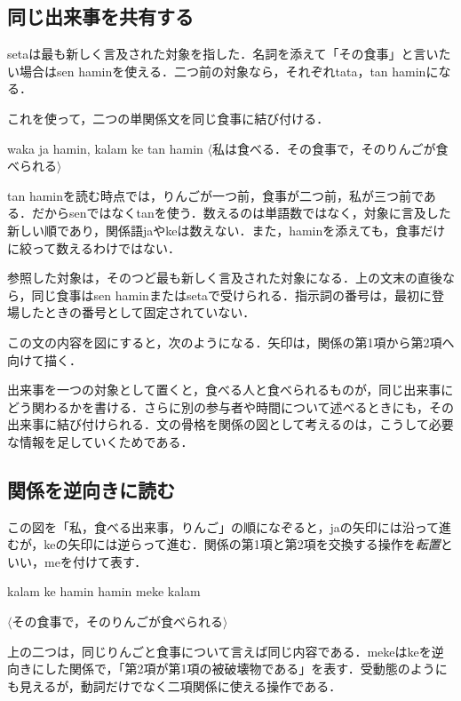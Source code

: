 \documentclass[b5paper, 10pt]{ltjsarticle}
\newcommand{\ko}[1]{\textsf{#1}}
\newcommand{\sentence}[1]{$\langle$#1$\rangle$}
\begin{document}
\subsection{同じ出来事を共有する}
\ko{seta}は最も新しく言及された対象を指した．名詞を添えて「その食事」と言いたい場合は\ko{sen hamin}を使える．二つ前の対象なら，それぞれ\ko{tata}，\ko{tan hamin}になる．

これを使って，二つの単関係文を同じ食事に結び付ける．
\begin{exe}
    \ex \ko{waka ja hamin, kalam ke tan hamin}
    \glt \sentence{私は食べる．その食事で，そのりんごが食べられる}
\end{exe}
\ko{tan hamin}を読む時点では，りんごが一つ前，食事が二つ前，私が三つ前である．だから\ko{sen}ではなく\ko{tan}を使う．数えるのは単語数ではなく，対象に言及した新しい順であり，関係語\ko{ja}や\ko{ke}は数えない．また，\ko{hamin}を添えても，食事だけに絞って数えるわけではない．

参照した対象は，そのつど最も新しく言及された対象になる．上の文末の直後なら，同じ食事は\ko{sen hamin}または\ko{seta}で受けられる．指示詞の番号は，最初に登場したときの番号として固定されていない．

この文の内容を図にすると，次のようになる．矢印は，関係の第1項から第2項へ向けて描く．
\begin{center}
\end{center}
出来事を一つの対象として置くと，食べる人と食べられるものが，同じ出来事にどう関わるかを書ける．さらに別の参与者や時間について述べるときにも，その出来事に結び付けられる．文の骨格を関係の図として考えるのは，こうして必要な情報を足していくためである．

\subsection{関係を逆向きに読む}
この図を「私，食べる出来事，りんご」の順になぞると，\ko{ja}の矢印には沿って進むが，\ko{ke}の矢印には逆らって進む．関係の第1項と第2項を交換する操作を\emph{転置}といい，\ko{me}を付けて表す．
\begin{exe}
    \ex\begin{xlist}
        \ex \ko{kalam ke hamin}
        \ex \ko{hamin meke kalam}
    \end{xlist}
    \glt \sentence{その食事で，そのりんごが食べられる}
\end{exe}
上の二つは，同じりんごと食事について言えば同じ内容である．\ko{meke}は\ko{ke}を逆向きにした関係で，「第2項が第1項の被破壊物である」を表す．受動態のようにも見えるが，動詞だけでなく二項関係に使える操作である．
\end{document}
